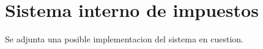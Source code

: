 \section{Sistema interno de impuestos}

Se adjunta una posible implementacion del sistema en cuestion.


